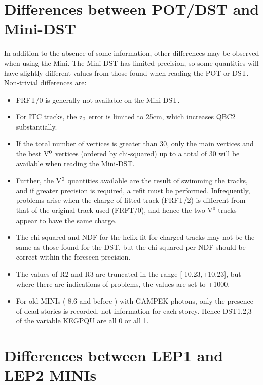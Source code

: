 \section{\label{sec-dbpam}Differences between POT/DST and Mini-DST}
\par
In addition to the absence of some information, other differences
may be
observed when using the Mini.  The Mini-DST has limited precision,
so some quantities
will have slightly different values from those found when reading
the POT or DST.
Non-trivial differences are:
\begin{itemize}
\item FRFT/0 is generally not available on the Mini-DST.
\item For ITC tracks, the z$\sb{0}$ error is limited to 25cm, which
increases QBC2 substantially.
\item If the total number of vertices is greater than 30, only the main
vertices and the best V$\sp{0}$ vertices (ordered
by chi-squared) up to a total of 30 will be available when reading
the Mini-DST.
\item Further, the V$\sp{0}$
quantities available are the result of swimming the tracks,
and if greater precision is required, a refit must be performed.
Infrequently, problems arise when the charge of fitted track
(FRFT/2) is different from that of the original track used (FRFT/0),
and hence the two V$^0$ tracks appear to have the same charge.
\item The chi-squared and NDF for the helix fit for charged tracks may not
be the same as those found for the DST, but the chi-squared per NDF
should be correct within the foreseen precision.
\item The values of R2 and R3 are truncated in the range [-10.23,+10.23],
but where there are indications of problems, the values are set to +1000.
\item For old MINIs ( 8.6 and before ) with GAMPEK photons, only the presence of dead stories is recorded,
not information for each storey. Hence DST1,2,3 of the variable KEGPQU are
all 0 or all 1.
\end{itemize}

\par
\section{\label{sec-mlep}Differences between LEP1 and LEP2 MINIs}
\par

